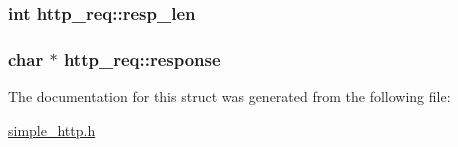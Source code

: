 \subsubsection[{resp\+\_\+len}]{\setlength{\rightskip}{0pt plus 5cm}int http\+\_\+req\+::resp\+\_\+len}\label{structhttp__req_a4e2566b23f613c01dba8f31a8478caea}
\hypertarget{structhttp__req_ab7c817594b1d5f1f9fab631b95605b5c}{}
\subsubsection[{response}]{\setlength{\rightskip}{0pt plus 5cm}char $\ast$ http\+\_\+req\+::response}\label{structhttp__req_ab7c817594b1d5f1f9fab631b95605b5c}


The documentation for this struct was generated from the following file\+:\begin{DoxyCompactItemize}
\item 
\hyperlink{simple__http_8h}{simple\+\_\+http.\+h}\end{DoxyCompactItemize}
